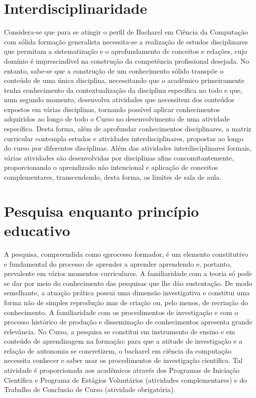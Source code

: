 \documentclass[
	12pt,				%
	openright,			%
  oneside,     %
	a4paper,			%
	english,			%
	french,				%
	spanish,			%
	brazil				%
	]{abntex2}
\begin{document}
\section{Interdisciplinaridade}

Considera-se que para se atingir o perfil de Bacharel em Ciência da Computação com sólida
formação generalista necessita-se a realização de estudos disciplinares que
permitam a sistematização e o aprofundamento de conceitos e relações, cujo
domínio é imprescindível na construção da competência profissional desejada. No
entanto, sabe-se que a construção de um conhecimento sólido transpõe o conteúdo
de uma única disciplina, necessitando que o acadêmico primeiramente tenha
conhecimento da contextualização da disciplina específica no todo e que, num
segundo momento, desenvolva atividades que necessitem dos conteúdos expostos em
várias disciplinas, tornando possível aplicar conhecimentos adquiridos ao longo
de todo o Curso no desenvolvimento de uma atividade específica. Desta forma,
além de aprofundar conhecimentos disciplinares, a matriz curricular contempla
estudos e atividades interdisciplinares, propostas ao longo do curso por
diferentes disciplinas. Além das atividades interdisciplinares formais, várias
atividades são desenvolvidas por disciplinas afins concomitantemente,
proporcionando o aprendizado não intencional e aplicação de conceitos
complementares, transcendendo, desta forma, os limites de sala de aula. 

\section{Pesquisa enquanto princípio educativo}

A pesquisa, compreendida como qprocesso formador, é um elemento constitutivo e
fundamental do processo de aprender a aprender aprendendo e, portanto,
prevalente em vários momentos curriculares. A familiaridade com a teoria só pode
se dar por meio do conhecimento das pesquisas que lhe dão sustentação. De modo
semelhante, a atuação prática possui uma dimensão investigativa e constitui uma
forma não de simples reprodução mas de criação ou, pelo menos, de recriação do
conhecimento. A familiaridade com os procedimentos de investigação e com o
processo histórico de produção e disseminação de conhecimentos apresenta grande
relevância. No Curso, a pesquisa se constitui em instrumento de ensino e em
conteúdo de aprendizagem na formação: para que a atitude de investigação e a
relação de autonomia se concretizem, o bacharel em ciência da computação
necessita conhecer e saber usar os procedimentos de investigação científica. Tal
atividade é proporcionada aos acadêmicos através dos Programas de Iniciação
Científica e Programa de Estágios Voluntários (atividades complementares) e do
Trabalho de Conclusão de Curso (atividade obrigatória).
\end{document}
